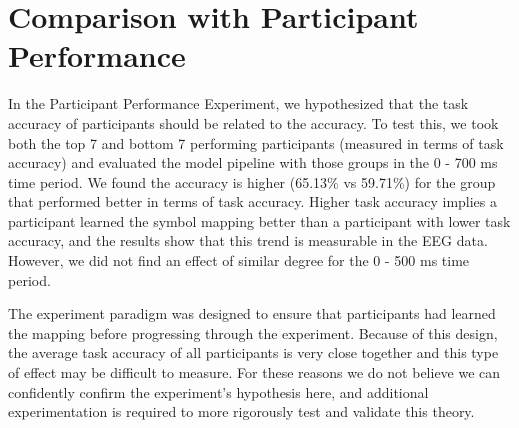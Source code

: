 \section{Comparison with Participant Performance}
In the Participant Performance Experiment, we hypothesized that the task 
accuracy of participants should be related to the \tvt accuracy. To test this, 
we took both the top 7 and bottom 7 performing participants (measured in terms 
of task accuracy) and evaluated the model pipeline with those groups in the 0 - 
700 ms time period.  We found the \tvt accuracy is higher (65.13\% vs 59.71\%) 
for the group that performed better in terms of task accuracy. Higher task 
accuracy implies a participant learned the symbol mapping better than a 
participant with lower task accuracy, and the \tvt results show that this trend 
is measurable in the EEG data.  However, we did not find an effect of similar 
degree for the 0 - 500 ms time period.

The experiment paradigm was designed to ensure that participants had learned 
the mapping before progressing through the experiment. Because of this design, 
the average task accuracy of all participants is very close together and this 
type of effect may be difficult to measure. For these reasons we do not believe 
we can confidently confirm the experiment's hypothesis here, and additional 
experimentation is required to more rigorously test and validate this theory.
